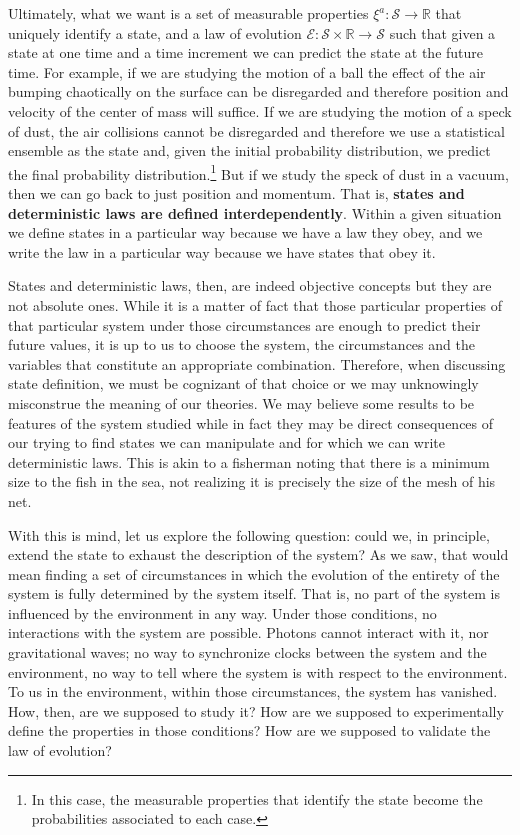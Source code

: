\documentclass[11pt]{article}
\begin{document}
Ultimately, what we want is a set of measurable properties $\xi^a : \mathcal{S} \to \mathbb{R}$ that uniquely identify a state, and a law of evolution $\mathcal{E} : \mathcal{S} \times \mathbb{R} \to \mathcal{S}$ such that given a state at one time and a time increment we can predict the state at the future time. For example, if we are studying the motion of a ball the effect of the air bumping chaotically on the surface can be disregarded and therefore position and velocity of the center of mass will suffice. If we are studying the motion of a speck of dust, the air collisions cannot be disregarded and therefore we use a statistical ensemble as the state and, given the initial probability distribution, we predict the final probability distribution.\footnote{In this case, the measurable properties that identify the state become the probabilities associated to each case.} But if we study the speck of dust in a vacuum, then we can go back to just position and momentum. That is, \textbf{states and deterministic laws are defined interdependently}. Within a given situation we define states in a particular way because we have a law they obey, and we write the law in a particular way because we have states that obey it.

States and deterministic laws, then, are indeed objective concepts but they are not absolute ones. While it is a matter of fact that those particular properties of that particular system under those circumstances are enough to predict their future values, it is up to us to choose the system, the circumstances and the variables that constitute an appropriate combination. Therefore, when discussing state definition, we must be cognizant of that choice or we may unknowingly misconstrue the meaning of our theories. We may believe some results to be features of the system studied while in fact they may be direct consequences of our trying to find states we can manipulate and for which we can write deterministic laws. This is akin to a fisherman noting that there is a minimum size to the fish in the sea, not realizing it is precisely the size of the mesh of his net.

With this is mind, let us explore the following question: could we, in principle, extend the state to exhaust the description of the system? As we saw, that would mean finding a set of circumstances in which the evolution of the entirety of the system is fully determined by the system itself. That is, no part of the system is influenced by the environment in any way. Under those conditions, no interactions with the system are possible. Photons cannot interact with it, nor gravitational waves; no way to synchronize clocks between the system and the environment, no way to tell where the system is with respect to the environment. To us in the environment, within those circumstances, the system has vanished. How, then, are we supposed to study it? How are we supposed to experimentally define the properties in those conditions? How are we supposed to validate the law of evolution?
\end{document}
